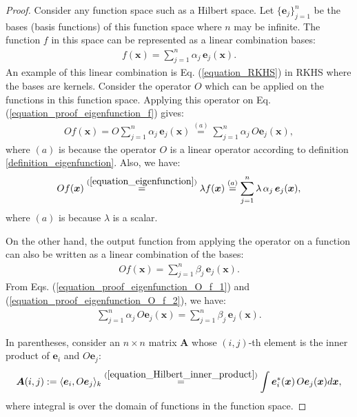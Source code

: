 \documentclass[lang=cn,10pt]{gorgeousnbook}
\numberwithin{equation}{section}%
\numberwithin{figure}{section}%
\begin{document}
\begin{proof}
Consider any function space such as a Hilbert space. Let $\{\boldsymbol{e}_j\}_{j=1}^n$ be the bases (basis functions) of this function space where $n$ may be infinite. The function $f$ in this space can be represented as a linear combination bases:
\begin{align}\label{equation_proof_eigenfunction_f}
f(\boldsymbol{x}) = \sum_{j=1}^n \alpha_j\, \boldsymbol{e}_j(\boldsymbol{x}).
\end{align}
An example of this linear combination is Eq. (\ref{equation_RKHS}) in RKHS where the bases are kernels. 
Consider the operator $O$ which can be applied on the functions in this function space.
Applying this operator on Eq. (\ref{equation_proof_eigenfunction_f}) gives:
\begin{align}\label{equation_proof_eigenfunction_O_f_1}
O f(\boldsymbol{x}) = O\sum_{j=1}^n \alpha_j\, \boldsymbol{e}_j(\boldsymbol{x}) \overset{(a)}{=} \sum_{j=1}^n \alpha_j\, O\boldsymbol{e}_j(\boldsymbol{x}),
\end{align}
where $(a)$ is because the operator $O$ is a linear operator according to definition \ref{definition_eigenfunction}.
Also, we have: 
\begin{align}\label{equation_proof_eigenfunction_lambda_f}
O f(\boldsymbol{x}) \overset{(\ref{equation_eigenfunction})}{=} \lambda f(\boldsymbol{x}) \overset{(a)}{=} \sum_{j=1}^n \lambda\, \alpha_j\, \boldsymbol{e}_j(\boldsymbol{x}),
\end{align}
where $(a)$ is because $\lambda$ is a scalar. 

On the other hand, the output function from applying the operator on a function can also be written as a linear combination of the bases:
\begin{align}\label{equation_proof_eigenfunction_O_f_2}
O f(\boldsymbol{x}) = \sum_{j=1}^n \beta_j\, \boldsymbol{e}_j(\boldsymbol{x}).
\end{align}
From Eqs. (\ref{equation_proof_eigenfunction_O_f_1}) and (\ref{equation_proof_eigenfunction_O_f_2}), we have:
\begin{align}\label{equation_proof_eigenfunction_O_f_3}
\sum_{j=1}^n \alpha_j\, O\boldsymbol{e}_j(\boldsymbol{x}) = \sum_{j=1}^n \beta_j\, \boldsymbol{e}_j(\boldsymbol{x}).
\end{align}

In parentheses, consider an $n \times n$ matrix $\boldsymbol{A}$ whose $(i,j)$-th element is the inner product of $\boldsymbol{e}_i$ and $O \boldsymbol{e}_j$:
\begin{align}\label{equation_proof_eigenfunction_A}
\boldsymbol{A}(i,j) := \langle \boldsymbol{e}_i, O\boldsymbol{e}_j \rangle_k \overset{(\ref{equation_Hilbert_inner_product})}{=} \int \boldsymbol{e}_i^*(\boldsymbol{x})\, O\boldsymbol{e}_j(\boldsymbol{x}) d\boldsymbol{x},
\end{align}
where integral is over the domain of functions in the function space. 


\end{proof}
\end{document}
